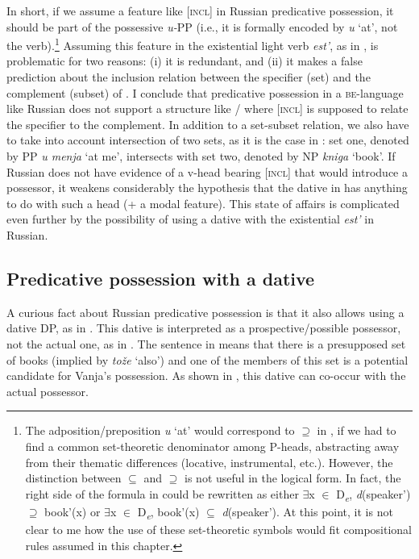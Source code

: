 \documentclass[output=paper,colorlinks,citecolor=brown,modfonts,nonflat]{langsci/langscibook}
\begin{document}
In short, if we assume a feature like [\textsc{incl}] in Russian predicative possession, it should be part of the possessive \textit{u-}PP (i.e., it is formally encoded by \textit{u} ‘at’, not the verb).\footnote{The adposition/preposition \textit{u} ‘at’ would correspond to \textrm{${\supseteq}$} in , if we had to find a common set-theoretic denominator among P-heads, abstracting away from their thematic differences (locative, instrumental, etc.). However, the distinction between \textrm{${\subseteq}$} and \textrm{${\supseteq}$} is not useful in the logical form. In fact, the right side of the formula in  could be rewritten as either \textrm{${\exists}$}x \textrm{${\in}$} D\textit{\textsubscript{e}}, \textit{d}(speaker\textrm{'}) \textrm{${\supseteq}$} book\textrm{'}(x) or \textrm{${\exists}$}x \textrm{${\in}$} D\textit{\textsubscript{e}}, book\textrm{'}(x) \textrm{${\subseteq}$} \textit{d}(speaker\textrm{'}). At this point, it is not clear to me how the use of these set-theoretic symbols would fit compositional rules assumed in this chapter.}  Assuming this feature in the existential light verb \textit{est’}, as in , is problematic for two reasons: (i) it is redundant, and (ii) it makes a false prediction about the inclusion relation between the specifier (set) and the complement (subset) of \liv . I conclude that predicative possession in a \textsc{be}{}-language like Russian does not support a structure like / where [\textsc{incl}] is supposed to relate the specifier to the complement. In addition to a set-subset relation, we also have to take into account intersection of two sets, as it is the case in : set one, denoted by PP \textit{u menja} ‘at me’, intersects with set two, denoted by NP \textit{kniga} ‘book’. If Russian does not have evidence of a v-head bearing [\textsc{incl}] that would introduce a possessor, it weakens considerably the hypothesis that the dative in  has anything to do with such a head (+ a modal feature). This state of affairs is complicated even further by the possibility of using a dative with the existential \textit{est’} in Russian.

\subsection{Predicative possession with a dative}\label{sec:tsedryk:2.3}

A curious fact about Russian predicative possession is that it also allows using a dative DP, as in . This dative is interpreted as a prospective/possible possessor, not the actual one, as in . The sentence in  means that there is a presupposed set of books (implied by \textit{tože} ‘also’) and one of the members of this set is a potential candidate for Vanja’s possession. As shown in , this dative can co-occur with the actual possessor. 
\end{document}
